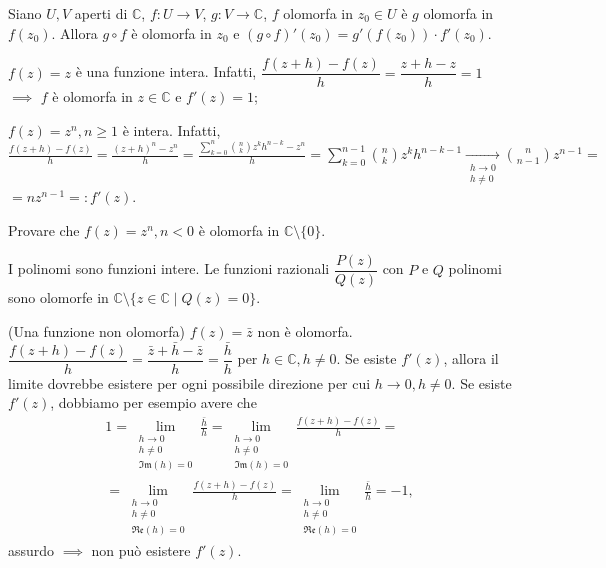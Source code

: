\begin{prop}
  Siano $U, V$ aperti di $\mathbb{C}$, $f:U \longrightarrow V$, $g:V \longrightarrow \mathbb{C}$, $f$ olomorfa in $z_0 \in U$ è $g$ olomorfa in $f(z_0)$. Allora $g \circ f$ è olomorfa in $z_0$ e $(g \circ f)'(z_0)=g'(f(z_0))\cdot f'(z_0)$.
\end{prop}

\begin{ex}
  \begin{nlist}
    \item $f(z)=z$ è una funzione intera. Infatti, $\dfrac{f(z+h)-f(z)}{h}=\dfrac{z+h-z}{h}=1$ $\implies$ $f$ è olomorfa in $z \in \mathbb{C}$ e $f'(z)=1$;
    \item $f(z)=z^n, n \ge 1$ è intera.
    Infatti, $\displaystyle \frac{f(z+h)-f(z)}{h}=\frac{(z+h)^n-z^n}{h}=\frac{\sum_{k=0}^n \binom{n}{k}z^kh^{n-k}-z^n}{h}=\sum_{k=0}^{n-1} \binom{n}{k}z^kh^{n-k-1} \xrightarrow[\substack{h \longrightarrow 0 \\ h\not=0}]{} \binom{n}{n-1} z^{n-1}=$\\
    $=nz^{n-1}=:f'(z)$.
  \end{nlist}
\end{ex}

\begin{exc}
  Provare che $f(z)=z^n, n<0$ è olomorfa in $\mathbb{C}\setminus\{0\}$.
\end{exc}

\begin{oss}
  I polinomi sono funzioni intere. Le funzioni razionali $\dfrac{P(z)}{Q(z)}$ con $P$ e $Q$ polinomi sono olomorfe in $\mathbb{C} \setminus \{z \in \mathbb{C} \mid Q(z)=0\}$.
\end{oss}

\begin{ex}
  (Una funzione non olomorfa) $f(z)=\bar{z}$ non è olomorfa. $\dfrac{f(z+h)-f(z)}{h}=\dfrac{\bar{z}+\bar{h}-\bar{z}}{h}=\dfrac{\bar{h}}{h}$ per $h \in \mathbb{C}, h \not=0$. Se esiste $f'(z)$, allora il limite dovrebbe esistere per ogni possibile direzione per cui $h \longrightarrow 0, h\not=0$. Se esiste $f'(z)$, dobbiamo per esempio avere che
  \begin{align*}
    1=\lim_{\substack{h \longrightarrow 0 \\ h\not=0 \\ \mathfrak{Im}(h)=0}} \frac{\bar{h}}{h}=\lim_{\substack{h \longrightarrow 0 \\ h\not=0 \\ \mathfrak{Im}(h)=0}} \frac{f(z+h)-f(z)}{h}=\\
    =\lim_{\substack{h \longrightarrow 0 \\ h\not=0 \\ \mathfrak{Re}(h)=0}} \frac{f(z+h)-f(z)}{h}=\lim_{\substack{h \longrightarrow 0 \\ h\not=0 \\ \mathfrak{Re}(h)=0}} \frac{\bar{h}}{h}=-1,
  \end{align*}
  assurdo $\implies$ non può esistere $f'(z)$.
\end{ex}

